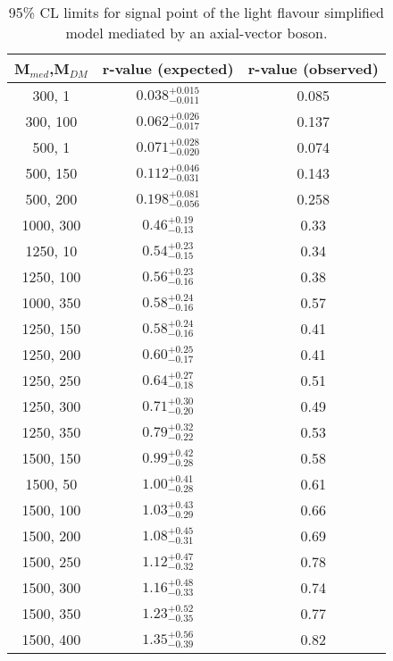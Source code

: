 \begin{table}[h!]
    \caption{%
    95\% CL limits for signal point of the light flavour simplified model 
    mediated by an axial-vector boson. }
    \label{tab:DMAV_limits}
    \centering
    \begin{tabular}{ ccc }
        \hline\hline
        M$_{med}$,M$_{DM}$ & r-value (expected) & r-value (observed) \\ 
        \hline
         300, 1    & $0.038_{-0.011}^{+0.015}$ & 0.085 \\
         300, 100  & $0.062_{-0.017}^{+0.026}$ & 0.137 \\
         500, 1    & $0.071_{-0.020}^{+0.028}$ & 0.074 \\
         500, 150  & $0.112_{-0.031}^{+0.046}$ & 0.143 \\
         500, 200  & $0.198_{-0.056}^{+0.081}$ & 0.258 \\
         1000, 300 & $0.46_{-0.13}^{+0.19}$    & 0.33  \\
         1250, 10  & $0.54_{-0.15}^{+0.23}$    & 0.34  \\
         1250, 100 & $0.56_{-0.16}^{+0.23}$    & 0.38  \\
         1000, 350 & $0.58_{-0.16}^{+0.24}$    & 0.57  \\
         1250, 150 & $0.58_{-0.16}^{+0.24}$    & 0.41  \\
         1250, 200 & $0.60_{-0.17}^{+0.25}$    & 0.41  \\
         1250, 250 & $0.64_{-0.18}^{+0.27}$    & 0.51  \\
         1250, 300 & $0.71_{-0.20}^{+0.30}$    & 0.49  \\
         1250, 350 & $0.79_{-0.22}^{+0.32}$    & 0.53  \\
         1500, 150 & $0.99_{-0.28}^{+0.42}$    & 0.58  \\
         1500, 50  & $1.00_{-0.28}^{+0.41}$    & 0.61  \\
         1500, 100 & $1.03_{-0.29}^{+0.43}$    & 0.66  \\
         1500, 200 & $1.08_{-0.31}^{+0.45}$    & 0.69  \\
         1500, 250 & $1.12_{-0.32}^{+0.47}$    & 0.78  \\
         1500, 300 & $1.16_{-0.33}^{+0.48}$    & 0.74  \\
         1500, 350 & $1.23_{-0.35}^{+0.52}$    & 0.77  \\
         1500, 400 & $1.35_{-0.39}^{+0.56}$    & 0.82  \\
        \hline\hline
    \end{tabular}
\end{table}

